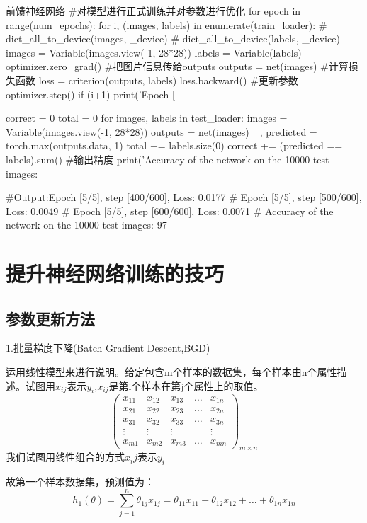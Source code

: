 \documentclass[openbib]{article}
\begin{document}
\begin{Python}{前馈神经网络}
	#对模型进行正式训练并对参数进行优化
	for epoch in range(num_epochs):
	for i, (images, labels) in enumerate(train_loader):
	# dict_all_to_device(images, _device)
	# dict_all_to_device(labels, _device)
	images = Variable(images.view(-1, 28*28))
	labels = Variable(labels)
	optimizer.zero_grad()
	#把图片信息传给outputs
	outputs = net(images)
	#计算损失函数
	loss = criterion(outputs, labels)
	loss.backward()
	#更新参数
	optimizer.step()
	if (i+1) %
	print('Epoch [%
	
	correct = 0
	total = 0
	for images, labels in test_loader:
	images = Variable(images.view(-1, 28*28))
	outputs = net(images)
	_, predicted = torch.max(outputs.data, 1)
	total += labels.size(0)
	correct += (predicted == labels).sum()
	#输出精度
	print('Accuracy of the network on the 10000 test images: %
	
	#Output:Epoch [5/5], step [400/600], Loss: 0.0177
	#		Epoch [5/5], step [500/600], Loss: 0.0049
	#		Epoch [5/5], step [600/600], Loss: 0.0071
	#		Accuracy of the network on the 10000 test images: 97 %
\end{Python}
\section{提升神经网络训练的技巧}
\subsection{参数更新方法}
\begin{center}
	1.批量梯度下降(Batch Gradient Descent,BGD)
\end{center}

运用线性模型来进行说明。给定包含m个样本的数据集，每个样本由n个属性描述。试图用$x_{ij}$表示$y_i$,$x_{ij}$是第i个样本在第j个属性上的取值。
$$
\begin{pmatrix}
	x_{11} &x_{12}  &x_{13}  & \dots &x_{1n}  \\
	x_{21} &x_{22}  &x_{23}  & \dots &x_{2n} \\
	x_{31} &x_{32}  &x_{33}  & \dots &x_{3n}  \\
	\vdots&\vdots  &\vdots  &  &\vdots  \\
	x_{m1} &x_{m2}  &x_{m3}  & \dots &x_{mn}
\end{pmatrix} _{m\times n}
$$
我们试图用线性组合的方式$x_ij$表示$y_i$

故第一个样本数据集，预测值为：
$$h_1(\theta) =\sum_{j=1}^{n}\theta_{1j}x_{1j}=\theta_{11}x_{11}+\theta_{12}x_{12}+\dots+\theta_{1n}x_{1n}$$
\end{document}
